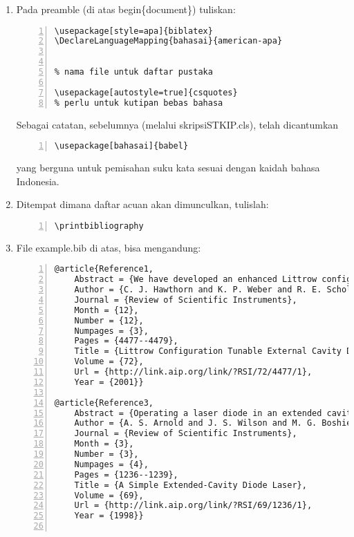 \begin{enumerate}
\item Pada preamble (di atas begin\{document\}) tuliskan:
\begin{Verbatim}[numbers=left,xleftmargin=5mm]
\usepackage[style=apa]{biblatex} 
\DeclareLanguageMapping{bahasai}{american-apa}

 
% nama file untuk daftar pustaka

\usepackage[autostyle=true]{csquotes} 
% perlu untuk kutipan bebas bahasa
\end{Verbatim}
Sebagai catatan, sebelumnya (melalui skripsiSTKIP.cls), telah 
dicantumkan 
\begin{Verbatim}[numbers=left,xleftmargin=5mm]
\usepackage[bahasai]{babel}
\end{Verbatim}
yang berguna untuk pemisahan suku kata sesuai dengan kaidah bahasa Indonesia.
\item Ditempat dimana daftar acuan akan dimunculkan,
tulislah:
\begin{Verbatim}[numbers=left,xleftmargin=5mm]
\printbibliography
\end{Verbatim}
\item File example.bib di atas, bisa mengandung:
\begin{Verbatim}[numbers=left,xleftmargin=5mm]
@article{Reference1,
	Abstract = {We have developed an enhanced Littrow configuration extended cavity diode laser (ECDL) that can be tuned without changing the direction of the output beam. The output of a conventional Littrow ECDL is reflected from a plane mirror fixed parallel to the tuning diffraction grating. Using a free-space Michelson wavemeter to measure the laser wavelength, we can tune the laser over a range greater than 10 nm without any alteration of alignment.},
	Author = {C. J. Hawthorn and K. P. Weber and R. E. Scholten},
	Journal = {Review of Scientific Instruments},
	Month = {12},
	Number = {12},
	Numpages = {3},
	Pages = {4477--4479},
	Title = {Littrow Configuration Tunable External Cavity Diode Laser with Fixed Direction Output Beam},
	Volume = {72},
	Url = {http://link.aip.org/link/?RSI/72/4477/1},
	Year = {2001}}

@article{Reference3,
	Abstract = {Operating a laser diode in an extended cavity which provides frequency-selective feedback is a very effective method of reducing the laser's linewidth and improving its tunability. We have developed an extremely simple laser of this type, built from inexpensive commercial components with only a few minor modifications. A 780~nm laser built to this design has an output power of 80~mW, a linewidth of 350~kHz, and it has been continuously locked to a Doppler-free rubidium transition for several days.},
	Author = {A. S. Arnold and J. S. Wilson and M. G. Boshier and J. Smith},
	Journal = {Review of Scientific Instruments},
	Month = {3},
	Number = {3},
	Numpages = {4},
	Pages = {1236--1239},
	Title = {A Simple Extended-Cavity Diode Laser},
	Volume = {69},
	Url = {http://link.aip.org/link/?RSI/69/1236/1},
	Year = {1998}}


\end{Verbatim}
\end{enumerate}
